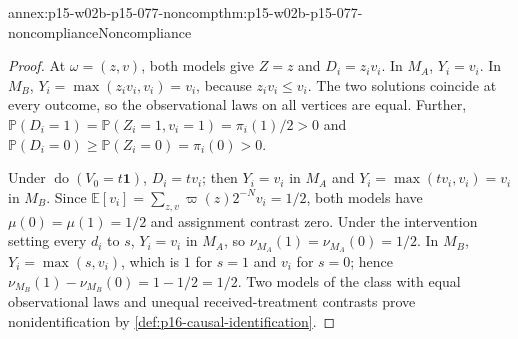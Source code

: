 \begin{annexitem}{annex:p15-w02b-p15-077-noncomp}{thm:p15-w02b-p15-077-noncompliance}{Noncompliance}
\begin{proof}
At \(\omega=(z,v)\), both models give \(Z=z\) and \(D_i=z_iv_i\). In
\(M_A\), \(Y_i=v_i\). In \(M_B\),
\(Y_i=\max(z_iv_i,v_i)=v_i\), because \(z_iv_i\leq v_i\). The two
solutions coincide at every outcome, so the observational laws on all
vertices are equal. Further,
\(\mathbb P(D_i=1)=\mathbb P(Z_i=1,v_i=1)=\pi_i(1)/2>0\) and
\(\mathbb P(D_i=0)\geq\mathbb P(Z_i=0)=\pi_i(0)>0\).

Under \(\operatorname{do}(V_0=t\mathbf 1)\), \(D_i=tv_i\); then
\(Y_i=v_i\) in \(M_A\) and \(Y_i=\max(tv_i,v_i)=v_i\) in \(M_B\). Since
\(\mathbb E[v_i]=\sum_{z,v}\varpi(z)2^{-N}v_i=1/2\), both models have
\(\mu(0)=\mu(1)=1/2\) and assignment contrast zero. Under the intervention
setting every \(d_i\) to \(s\), \(Y_i=v_i\) in \(M_A\), so
\(\nu_{M_A}(1)=\nu_{M_A}(0)=1/2\). In \(M_B\), \(Y_i=\max(s,v_i)\),
which is \(1\) for \(s=1\) and \(v_i\) for \(s=0\); hence
\(\nu_{M_B}(1)-\nu_{M_B}(0)=1-1/2=1/2\). Two models of the class with
equal observational laws and unequal received-treatment contrasts prove
nonidentification by \cref{def:p16-causal-identification}.
\end{proof}
\end{annexitem}

